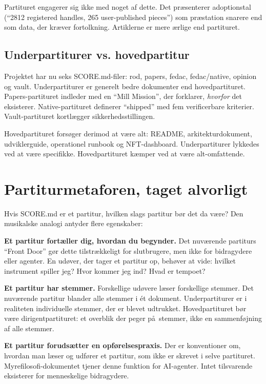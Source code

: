\documentclass[10pt,letterpaper,twocolumn]{article}
\begin{document}
Partituret engagerer sig ikke med noget af dette. Det pr\ae senterer adoptionstal (``2812 registered handles, 265 user-published pieces'') som pr\ae station snarere end som data, der kr\ae ver fortolkning. Artiklerne er mere \ae rlige end partituret.

\subsection{Underpartiturer vs. hovedpartitur}

Projektet har nu seks SCORE.md-filer: rod, papers, fedac, fedac/native, opinion og vault. Underpartiturer er generelt bedre dokumenter end hovedpartituret. Papers-partituret indleder med en ``Mill Mission'', der forklarer, \emph{hvorfor} det eksisterer. Native-partituret definerer ``shipped'' med fem verificerbare kriterier. Vault-partituret kortl\ae gger sikkerhedsstillingen.

Hovedpartituret fors\o ger derimod at v\ae re alt: README, arkitekturdokument, udviklerguide, operationel runbook og NFT-dashboard. Underpartiturer lykkedes ved at v\ae re specifikke. Hovedpartituret k\ae mper ved at v\ae re alt-omfattende.

\section{Partiturmetaforen, taget alvorligt}

Hvis SCORE.md er et partitur, hvilken slags partitur b\o r det da v\ae re? Den musikalske analogi antyder flere egenskaber:

\textbf{Et partitur fort\ae ller dig, hvordan du begynder.} Det nuv\ae rende partiturs ``Front Door'' g\o r dette tilstr\ae kkeligt for slutbrugere, men ikke for bidragydere eller agenter. En ud\o ver, der tager et partitur op, beh\o ver at vide: hvilket instrument spiller jeg? Hvor kommer jeg ind? Hvad er tempoet?

\textbf{Et partitur har stemmer.} Forskellige ud\o vere l\ae ser forskellige stemmer. Det nuv\ae rende partitur blander alle stemmer i \' et dokument. Underpartiturer er i realiteten individuelle stemmer, der er blevet udtrukket. Hovedpartituret b\o r v\ae re dirigentpartituret: et overblik der peger p\aa\ stemmer, ikke en sammenf\o jning af alle stemmer.

\textbf{Et partitur foruds\ae tter en opf\o relsespraxis.} Der er konventioner om, hvordan man l\ae ser og udf\o rer et partitur, som ikke er skrevet i selve partituret. Myrefilosofi-dokumentet tjener denne funktion for AI-agenter. Intet tilsvarende eksisterer for menneskelige bidragydere.
\end{document}
